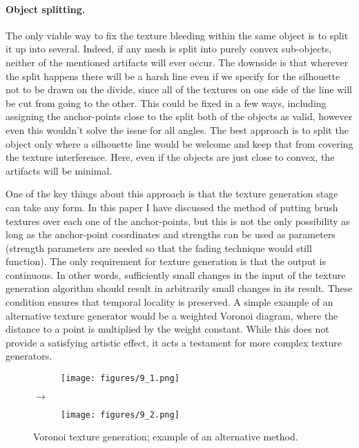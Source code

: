 \documentclass[a4paper, 12pt]{article}
\begin{document}
\paragraph{Object splitting.}
The only viable way to fix the texture bleeding within the same object is to split it up into several. Indeed, if any mesh is split into purely convex sub-objects, neither of the mentioned artifacts will ever occur. The downside is that wherever the split happens there will be a harsh line even if we specify for the silhouette not to be drawn on the divide, since all of the textures on one side of the line will be cut from going to the other. This could be fixed in a few ways, including assigning the anchor-points close to the split both of the objects as valid, however even this wouldn't solve the issue for all angles. The best approach is to split the object only where a silhouette line would be welcome and keep that from covering the texture interference. Here, even if the objects are just close to convex, the artifacts will be minimal.

One of the key things about this approach is that the texture generation stage can take any form. In this paper I have discussed the method of putting brush textures over each one of the anchor-points, but this is not the only possibility as long as the anchor-point coordinates and strengths can be used as parameters (strength parameters are needed so that the fading technique would still function). The only requirement for texture generation is that the output is continuous. In other words, sufficiently small changes in the input of the texture generation algorithm should result in arbitrarily small changes in its result. These condition ensures that temporal locality is preserved. A simple example of an alternative texture generator would be a weighted Voronoi diagram, where the distance to a point is multiplied by the weight constant. While this does not provide a satisfying artistic effect, it acts a testament for more complex texture generators.

\begin{figure}[htbp!]
  \centering
  \begin{subfigure}{0.2\columnwidth}
    \texttt{[image: figures/9\_1.png]}
  \end{subfigure}%
  $\bm{\rightarrow}$%
  \begin{subfigure}{0.2\columnwidth}
    \texttt{[image: figures/9\_2.png]}
  \end{subfigure}
  \caption{Voronoi texture generation; example of an alternative method.}
\end{figure}
\end{document}
